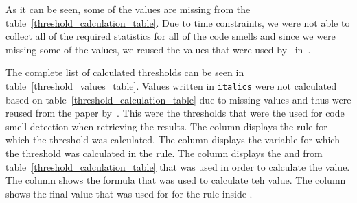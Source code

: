 As it can be seen, some of the values are missing from the table~\ref{threshold_calculation_table}.
Due to time constraints, we were not able to collect all of the required statistics for all of the code smells
and since we were missing some of the values, we reused the values that were used by~\citeauthor{ios_code_smell_paper} in~\cite{ios_code_smell_paper}.

The complete list of calculated thresholds can be seen in table~\ref{threshold_values_table}.
Values written in \texttt{italics} were not calculated based on table~\ref{threshold_calculation_table} due to missing values
and thus were reused from the paper by~\cite{ios_code_smell_paper}.
This were the thresholds that were the used for code smell detection when retrieving the results.
The column  displays the rule for which the threshold was calculated.
The column  displays the variable for which the threshold was calculated in the rule.
The column  displays the  and  from table~\ref{threshold_calculation_table}
that was used in order to calculate the value.
The column  shows the formula that was used to calculate teh value.
The column  shows the final value that was used for  for the rule inside .

